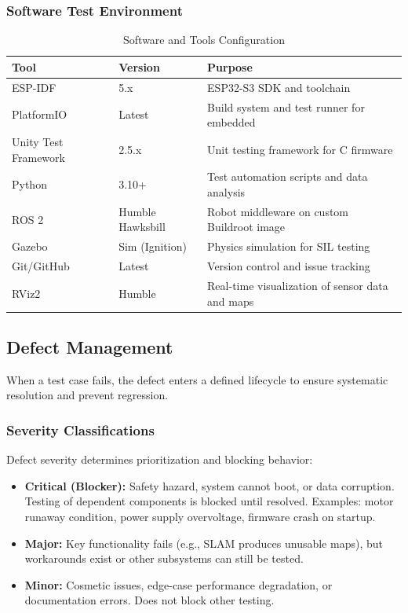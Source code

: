 \subsubsection{Software Test Environment}

\begin{table}[H]
    \centering
    \caption{Software and Tools Configuration}
    \label{tab:software_env}
    \begin{tabular}{@{}llp{5.5cm}@{}}
        \toprule
        \textbf{Tool} & \textbf{Version} & \textbf{Purpose} \\
        \midrule
        ESP-IDF & 5.x & ESP32-S3 SDK and toolchain \\
        PlatformIO & Latest & Build system and test runner for embedded \\
        Unity Test Framework & 2.5.x & Unit testing framework for C firmware \\
        Python & 3.10+ & Test automation scripts and data analysis \\
        ROS 2 & Humble Hawksbill & Robot middleware on custom Buildroot image \\
        Gazebo & Sim (Ignition) & Physics simulation for SIL testing \\
        Git/GitHub & Latest & Version control and issue tracking \\
        RViz2 & Humble & Real-time visualization of sensor data and maps \\
        \bottomrule
    \end{tabular}
\end{table}

\subsection{Defect Management}

When a test case fails, the defect enters a defined lifecycle to ensure systematic resolution and prevent regression.

\subsubsection{Severity Classifications}

Defect severity determines prioritization and blocking behavior:

\begin{itemize}
    \item \textbf{Critical (Blocker):} Safety hazard, system cannot boot, or data corruption. Testing of dependent components is blocked until resolved. Examples: motor runaway condition, power supply overvoltage, firmware crash on startup.
    \item \textbf{Major:} Key functionality fails (e.g., SLAM produces unusable maps), but workarounds exist or other subsystems can still be tested.
    \item \textbf{Minor:} Cosmetic issues, edge-case performance degradation, or documentation errors. Does not block other testing.
\end{itemize}

